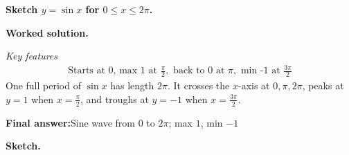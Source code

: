 \documentclass[11pt]{article}
\newcommand{\question}[1]{\par\medskip\noindent\textbf{#1}\par}
\begin{document}
\question{Sketch \( y = \sin x \) for \( 0 \leq x \leq 2\pi \).}

\textbf{Worked solution.}

\textit{Key features}
\[\begin{gathered}
\text{Starts at 0, max 1 at } \frac{\pi}{2}, \text{ back to 0 at } \pi, \text{ min -1 at } \frac{3\pi}{2}
\end{gathered}\]
One full period of \( \sin x \) has length \( 2\pi \). It crosses the \( x \)-axis at \( 0, \pi, 2\pi \), peaks at \( y = 1 \) when \( x = \tfrac{\pi}{2} \), and troughs at \( y = -1 \) when \( x = \tfrac{3\pi}{2} \).

\begin{answerbox}
\textbf{Final answer:}\quad Sine wave from \(\displaystyle 0\) to \(\displaystyle 2\pi\); max \(\displaystyle 1\), min \(\displaystyle -1\)
\end{answerbox}
\textbf{Sketch.}
\end{document}
